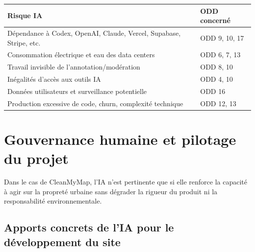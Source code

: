 \documentclass[
  10pt,
  a4paper,
  DIV=11,
  numbers=noendperiod,
  oneside]{scrreprt}
\newcounter{none} %
\begin{document}
{\def\LTcaptype{none} %
\begin{longtable}[]{@{}
  >{\raggedright\arraybackslash}p{}
  >{\raggedright\arraybackslash}p{}@{}}
\toprule\noalign{}
\begin{minipage}[b]{\linewidth}\raggedright
Risque IA
\end{minipage} & \begin{minipage}[b]{\linewidth}\raggedright
ODD concerné
\end{minipage} \\
\midrule\noalign{}
\endhead
\bottomrule\noalign{}
\endlastfoot
Dépendance à Codex, OpenAI, Claude, Vercel, Supabase, Stripe, etc. & ODD
9, 10, 17 \\
Consommation électrique et eau des data centers & ODD 6, 7, 13 \\
Travail invisible de l'annotation/modération & ODD 8, 10 \\
Inégalités d'accès aux outils IA & ODD 4, 10 \\
Données utilisateurs et surveillance potentielle & ODD 16 \\
Production excessive de code, churn, complexité technique & ODD 12,
13 \\
\end{longtable}
}

\section{Gouvernance humaine et pilotage du
projet}\label{gouvernance-humaine-et-pilotage-du-projet}

Dans le cas de CleanMyMap, l'IA n'est pertinente que si elle renforce la
capacité à agir sur la propreté urbaine sans dégrader la rigueur du
produit ni la responsabilité environnementale.

\subsection{Apports concrets de l'IA pour le développement du
site}\label{apports-concrets-de-lia-pour-le-duxe9veloppement-du-site}
\end{document}
